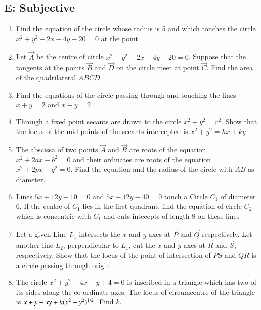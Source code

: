 \documentclass[journal,12pt,twocolumn]{IEEEtran}
\theoremstyle{remark}
\begin{document}
\subsection*{E: Subjective}
\begin{enumerate}
\item Find the equation of the circle whose radius is 5 and which touches the circle $x^2+y^2-2x-4y-20=0$ at the point 

\hfill {}
\item Let $\vec{A}$ be the centre of circle $x^2+y^2-2x-4y-20=0$. Suppose that the tangents at the points $\vec{B}$ and $\vec{D}$ on the circle meet at point $\vec{C}$. Find the area of the quadrilateral $ABCD$.

\hfill {}
\item Find the equations of the circle passing through  and touching the lines $x+y=2$ and $x-y=2$

\hfill {}
\item Through a fixed point  secants are drawn to the circle $x^2+y^2=r^2$. Show that the locus of the mid-points of the secants intercepted is $x^2+y^2=hx+ky$

\hfill {}
\item The abscissa of two points $\vec{A}$ and $\vec{B}$ are roots of the equation $x^2+2ax-b^2=0$ and their ordinates are roots of the equation $x^2+2px-q^2=0$. Find the equation and the radius of the circle with $AB$ as diameter.

\hfill {}
\item Lines $5x+12y-10=0$ and $5x-12y-40=0$ touch a Circle $C_1$ of diameter 6. If the centre of $C_1$ lies in the first quadrant, find the equation of circle $C_2$ which is concentric with $C_1$ and cuts intecepts of length 8 on these lines

\hfill {}
\item Let a given Line $L_1$ intersects the $x$ and $y$ axes at $\vec{P}$ and $\vec{Q}$ respectively. Let another line $L_2$, perpendicular to $L_1$, cut the $x$ and $y$ axes at $\vec{R}$ and $\vec{S}$, respectively. Show that the locus of the point of intersection of $PS$ and $QR$ is a circle passing through origin.

\hfill {}
\item The circle $x^2+y^2-4x-y+4=0$ is inscribed in a triangle which has two of its sides along the co-ordinate axes. The locus of circumcentre of the triangle is $x+y-xy+k(x^2+y^2)\textsuperscript{1/2}$. Find $k$.


\end{enumerate}
\end{document}
